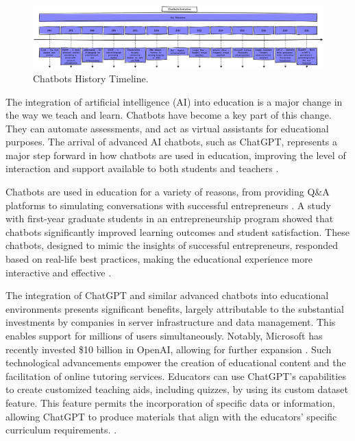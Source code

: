 \documentclass{l4proj}
\begin{document}
\begin{figure}[h]
  \centering
  \begin{adjustbox}{center,max height=0.18\textheight, max width=\linewidth}
    \includegraphics{images/chatbots timeline.png}
  \end{adjustbox}
  \caption{Chatbots History Timeline.}
\end{figure}

The integration of artificial intelligence (AI) into education is a major change in the way we teach and learn. Chatbots have become a key part of this change. They can automate assessments, and act as virtual assistants for educational purposes. The arrival of advanced AI chatbots, such as ChatGPT, represents a major step forward in how chatbots are used in education, improving the level of interaction and support available to both students and teachers \citep{Annuš2023}.

Chatbots are used in education for a variety of reasons, from providing Q\&A platforms to simulating conversations with successful entrepreneurs \citep{Vanichvasin2022}. A study with first-year graduate students in an entrepreneurship program showed that chatbots significantly improved learning outcomes and student satisfaction. These chatbots, designed to mimic the insights of successful entrepreneurs, responded based on real-life best practices, making the educational experience more interactive and effective \citep{Vanichvasin2022}.

The integration of ChatGPT and similar advanced chatbots into educational environments presents significant benefits, largely attributable to the substantial investments by companies in server infrastructure and data management. This enables support for millions of users simultaneously. Notably, Microsoft has recently invested \$10 billion in OpenAI, allowing for further expansion \citep{teamsilverbackMuchWill}. Such technological advancements empower the creation of educational content and the facilitation of online tutoring services. Educators can use ChatGPT's capabilities to create customized teaching aids, including quizzes, by using its custom dataset feature. This feature permits the incorporation of specific data or information, allowing ChatGPT to produce materials that align with the educators' specific curriculum requirements. \citep{Vasudevan2024}.
\end{document}
